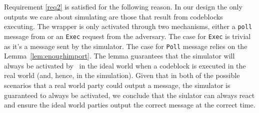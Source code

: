 Requirement \ref{req2} is satisfied for the following reason.
In our design the only outputs we care about simulating are those that result from codeblocks executing.
The wrapper is only activated through two mechanisms, either a \texttt{poll} message from \Environment or an \texttt{Exec} request from the adversary.
The case for \texttt{Exec} is trivial as it's a message sent by the simulator.
The case for \texttt{Poll} message relies on the Lemma~\ref{lem:enoughimport}.
The lemma guarantees that the simulator will always be activated by \Wasync~in the ideal world when a codeblock is executed in the real world (and, hence, in the simulation).
Given that in both of the possible scenarios that a real world party could output a message, the simulator is guaranteed to always be activated, we conclude that the siulator can always react and ensure the ideal world parties output the correct message at the correct time.

